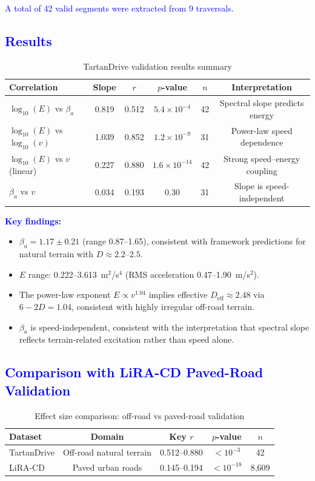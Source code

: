 \documentclass[11pt]{article}
\begin{document}
\textcolor{blue}{A total of 42 valid segments were extracted from 9 traversals.}

\textcolor{blue}{\subsection{Results}}

{\color{blue}
\begin{table}[h]
\centering
\caption{TartanDrive validation results summary}
\begin{tabular}{lccccc}
\hline
Correlation & Slope & $r$ & $p$-value & $n$ & Interpretation \\
\hline
$\log_{10}(E)$ vs $\beta_a$ & 0.819 & 0.512 & $5.4 \times 10^{-4}$ & 42 & Spectral slope predicts energy \\
$\log_{10}(E)$ vs $\log_{10}(v)$ & 1.039 & 0.852 & $1.2 \times 10^{-9}$ & 31 & Power-law speed dependence \\
$\log_{10}(E)$ vs $v$ (linear) & 0.227 & 0.880 & $1.6 \times 10^{-14}$ & 42 & Strong speed--energy coupling \\
$\beta_a$ vs $v$ & 0.034 & 0.193 & 0.30 & 31 & Slope is speed-independent \\
\hline
\end{tabular}
\end{table}
}

\textcolor{blue}{\textbf{Key findings:}}
{\color{blue}
\begin{itemize}
\item $\beta_a = 1.17 \pm 0.21$ (range 0.87--1.65), consistent with framework predictions for natural terrain with $D \approx 2.2$--$2.5$.
\item $E$ range: 0.222--3.613~m$^2$/s$^4$ (RMS acceleration 0.47--1.90~m/s$^2$).
\item The power-law exponent $E \propto v^{1.04}$ implies effective $D_{\mathrm{eff}} \approx 2.48$ via $6-2D = 1.04$, consistent with highly irregular off-road terrain.
\item $\beta_a$ is speed-independent, consistent with the interpretation that spectral slope reflects terrain-related excitation rather than speed alone.
\end{itemize}
}

\textcolor{blue}{\subsection{Comparison with LiRA-CD Paved-Road Validation}}

{\color{blue}
\begin{table}[h]
\centering
\caption{Effect size comparison: off-road vs paved-road validation}
\begin{tabular}{lcccc}
\hline
Dataset & Domain & Key $r$ & $p$-value & $n$ \\
\hline
TartanDrive & Off-road natural terrain & 0.512--0.880 & $<10^{-3}$ & 42 \\
LiRA-CD & Paved urban roads & 0.145--0.194 & $<10^{-18}$ & 8,609 \\
\hline
\end{tabular}
\end{table}
}
\end{document}
